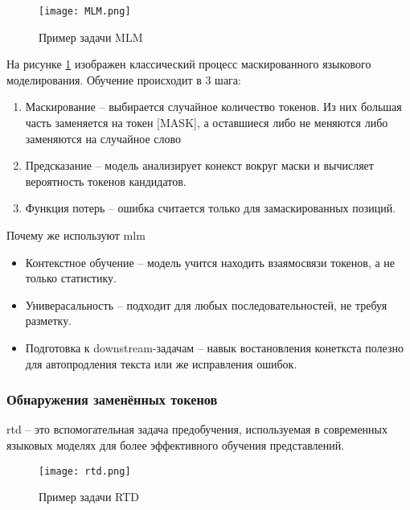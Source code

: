 \documentclass[../part_1.tex]{subfiles}
\begin{document}
\begin{figure}[h]
    \centering
    \texttt{[image: MLM.png]}
    \caption{Пример задачи MLM}
    \label{fig:mlm_bert}
\end{figure}
\par На рисунке \ref{fig:mlm_bert} изображен классический процесс маскированного языкового моделирования. Обучение происходит в 3 шага:
\begin{enumerate}
    \item Маскирование -- выбирается случайное количество токенов. Из них большая часть заменяется на токен [MASK], а оставшиеся либо не меняются либо заменяются на случайное слово
    \item Предсказание -- модель анализирует конекст вокруг маски и вычисляет вероятность токенов кандидатов.
    \item Функция потерь -- ошибка считается только для замаскированных позиций.
\end{enumerate}
\par Почему же используют \acrshort{mlm}
\begin{itemize}
    \item Контекстное обучение -- модель учится находить взаямосвязи токенов, а не только статистику.
    \item Универасальность -- подходит для любых последовательностей, не требуя разметку.
    \item Подготовка к downstream-задачам -- навык востановления конеткста полезно для автопродления текста или же исправления ошибок.
\end{itemize}

\subsubsection{Обнаружения заменённых токенов}
\par \acrfull{rtd} -- это вспомогательная задача предобучения, используемая в современных языковых моделях для более эффективного обучения представлений. 

\begin{figure}[h]
    \centering
    \texttt{[image: rtd.png]}
    \caption{Пример задачи RTD}
    \label{fig:rtd_bert}
\end{figure}
\end{document}
